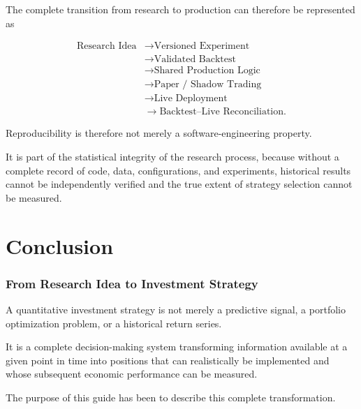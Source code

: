 \documentclass[11pt,a4paper]{article}
\begin{document}
The complete transition from research to production can therefore be represented
as

\begin{equation}
\boxed{
\begin{aligned}
\text{Research Idea}
&\rightarrow
\text{Versioned Experiment}
\\
&\rightarrow
\text{Validated Backtest}
\\
&\rightarrow
\text{Shared Production Logic}
\\
&\rightarrow
\text{Paper / Shadow Trading}
\\
&\rightarrow
\text{Live Deployment}
\\
&\rightarrow
\text{Backtest--Live Reconciliation}.
\end{aligned}
}
\end{equation}

Reproducibility is therefore not merely a software-engineering property.

It is part of the statistical integrity of the research process, because without
a complete record of code, data, configurations, and experiments, historical
results cannot be independently verified and the true extent of strategy
selection cannot be measured.


\part{Conclusion}

\section{From Research Idea to Investment Strategy}
\label{sec:conclusion_research_to_strategy}

A quantitative investment strategy is not merely a predictive signal, a
portfolio optimization problem, or a historical return series.

It is a complete decision-making system transforming information available at a
given point in time into positions that can realistically be implemented and
whose subsequent economic performance can be measured.

The purpose of this guide has been to describe this complete transformation.
\end{document}
